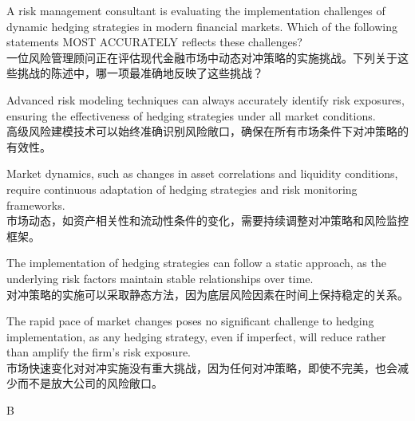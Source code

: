 \documentclass{article}
\newcounter{question} %
\begin{document}
\begin{question}
    A risk management consultant is evaluating the implementation challenges of dynamic hedging strategies in modern financial markets. Which of the following statements MOST ACCURATELY reflects these challenges?\\
    一位风险管理顾问正在评估现代金融市场中动态对冲策略的实施挑战。下列关于这些挑战的陈述中，哪一项最准确地反映了这些挑战？
\end{question}
    
    \begin{choices}
    \item Advanced risk modeling techniques can always accurately identify risk exposures, ensuring the effectiveness of hedging strategies under all market conditions. \\
    高级风险建模技术可以始终准确识别风险敞口，确保在所有市场条件下对冲策略的有效性。
    
    \item Market dynamics, such as changes in asset correlations and liquidity conditions, require continuous adaptation of hedging strategies and risk monitoring frameworks. \\
    市场动态，如资产相关性和流动性条件的变化，需要持续调整对冲策略和风险监控框架。
    
    \item The implementation of hedging strategies can follow a static approach, as the underlying risk factors maintain stable relationships over time. \\
    对冲策略的实施可以采取静态方法，因为底层风险因素在时间上保持稳定的关系。
    
    \item The rapid pace of market changes poses no significant challenge to hedging implementation, as any hedging strategy, even if imperfect, will reduce rather than amplify the firm's risk exposure. \\
    市场快速变化对对冲实施没有重大挑战，因为任何对冲策略，即使不完美，也会减少而不是放大公司的风险敞口。
\end{choices}
    
    \begin{correctanswer}
    B
    \end{correctanswer}
    
\end{document}
